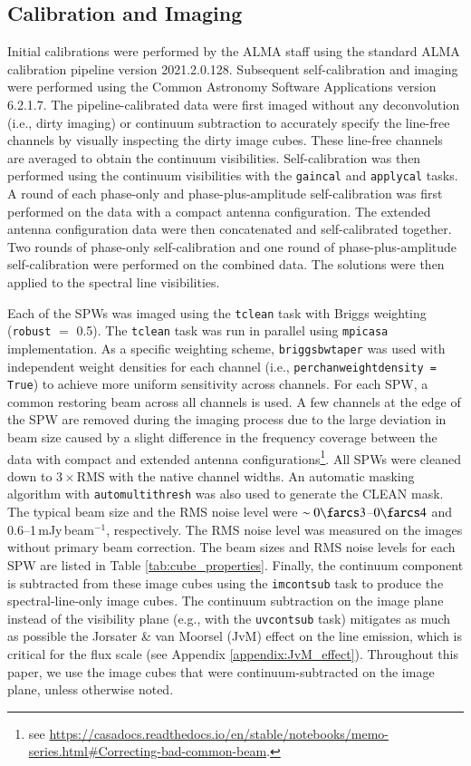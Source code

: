 \documentclass[twocolumn, twocolappendix, astrosymb, times]{aastex631}
\begin{document}
\subsection{Calibration and Imaging}
Initial calibrations were performed by the ALMA staff using the standard ALMA calibration pipeline version 2021.2.0.128. Subsequent self-calibration and imaging were performed using the Common Astronomy Software Applications \citep[CASA;][]{CASA} version 6.2.1.7. The pipeline-calibrated data were first imaged without any deconvolution (i.e., dirty imaging) or continuum subtraction to accurately specify the line-free channels by visually inspecting the dirty image cubes. These line-free channels are averaged to obtain the continuum visibilities. Self-calibration was then performed using the continuum visibilities with the \texttt{gaincal} and \texttt{applycal} tasks. A round of each phase-only and phase-plus-amplitude self-calibration was first performed on the data with a compact antenna configuration. The extended antenna configuration data were then concatenated and self-calibrated together. Two rounds of phase-only self-calibration and one round of phase-plus-amplitude self-calibration were performed on the combined data. The solutions were then applied to the spectral line visibilities.

Each of the SPWs was imaged using the \texttt{tclean} task \citep{Hogbom1974} with Briggs weighting (\texttt{robust} $=$ 0.5). The \texttt{tclean} task was run in parallel using \texttt{mpicasa} implementation. As a specific weighting scheme, \texttt{briggsbwtaper} was used with independent weight densities for each channel (i.e., \texttt{perchanweightdensity = True}) to achieve more uniform sensitivity across channels. For each SPW, a common restoring beam across all channels is used. A few channels at the edge of the SPW are removed during the imaging process due to the large deviation in beam size caused by a slight difference in the frequency coverage between the data with compact and extended antenna configurations\footnote{see \url{https://casadocs.readthedocs.io/en/stable/notebooks/memo-series.html\#Correcting-bad-common-beam}.}. All SPWs were cleaned down to 3\,$\times$\,RMS with the native channel widths. An automatic masking algorithm with \texttt{automultithresh} was also used to generate the CLEAN mask. The typical beam size and the RMS noise level were $\sim0\farcs3$--$0\farcs4$ and 0.6--1\,mJy\,beam$^{-1}$, respectively. The RMS noise level was measured on the images without primary beam correction. The beam sizes and RMS noise levels for each SPW are listed in Table \ref{tab:cube_properties}. Finally, the continuum component is subtracted from these image cubes using the \texttt{imcontsub} task to produce the spectral-line-only image cubes. The continuum subtraction on the image plane instead of the visibility plane (e.g., with the \texttt{uvcontsub} task) mitigates as much as possible the Jorsater \& van Moorsel (JvM) effect \citep{JvM, Czekala2021} on the line emission, which is critical for the flux scale (see Appendix \ref{appendix:JvM_effect}). Throughout this paper, we use the image cubes that were continuum-subtracted on the image plane, unless otherwise noted.
\end{document}
